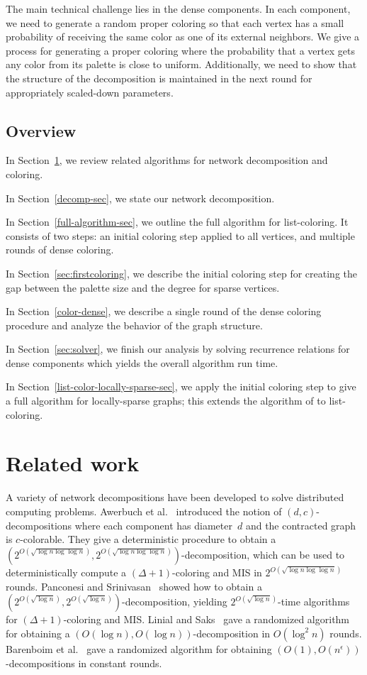 \documentclass[11pt]{amsart}
\begin{document}
The main technical challenge lies in the dense components. In each component, we need to generate a random proper coloring so that each vertex has a small probability of receiving the same color as one of its external neighbors.
We give a process for generating a proper coloring where the probability that a vertex gets any color from its palette is close to uniform. Additionally, we need to show that the structure of the decomposition is maintained in the next round for appropriately scaled-down parameters.


\subsection{Overview}
In Section~\ref{related-work}, we review related algorithms for network decomposition and coloring.

In Section~\ref{decomp-sec}, we state our network decomposition.

In Section~\ref{full-algorithm-sec}, we outline the full algorithm for list-coloring. It consists of two steps: an initial coloring step applied to all vertices, and multiple rounds of dense coloring.

In Section~\ref{sec:firstcoloring}, we describe the initial coloring step for creating the gap between the palette size and the degree for sparse vertices.

In Section~\ref{color-dense}, we describe a single round of the dense coloring procedure and analyze the behavior of the graph structure. 

In Section~\ref{sec:solver}, we finish our analysis by solving recurrence relations for dense components which yields the overall algorithm run time. 

In Section~\ref{list-color-locally-sparse-sec}, we apply the initial coloring step to give a full algorithm for locally-sparse graphs; this extends the algorithm of \cite{elk15} to list-coloring.

\section{Related work}\label{related-work}
A variety of network decompositions have been developed to solve distributed computing problems. Awerbuch et al.~\cite{awer89} introduced the notion of $(d,c)$-decompositions where each component has diameter~$d$ and the contracted graph is $c$-colorable. They give a deterministic procedure to obtain a $(2^{O(\sqrt{\log n \log \log n})}, 2^{O(\sqrt{\log n \log \log n})})$-decomposition, which can be used to deterministically compute a $(\Delta+1)$-coloring and MIS in $2^{O(\sqrt{\log n \log \log n})}$ rounds. Panconesi and Srinivasan~\cite{panc92} showed how to obtain a $(2^{O(\sqrt{\log n})}, 2^{O(\sqrt{\log n})})$-decomposition, yielding $2^{O(\sqrt{\log n})}$-time algorithms for $(\Delta+1)$-coloring and MIS. Linial and Saks~\cite{lin93} gave a randomized algorithm for obtaining a $(O(\log n), O(\log n))$-decomposition in $O(\log^2 n)$ rounds. Barenboim et al.~\cite{bar15} gave a randomized algorithm for obtaining $(O(1),O(n^\epsilon))$-decompositions in constant rounds.
\end{document}
